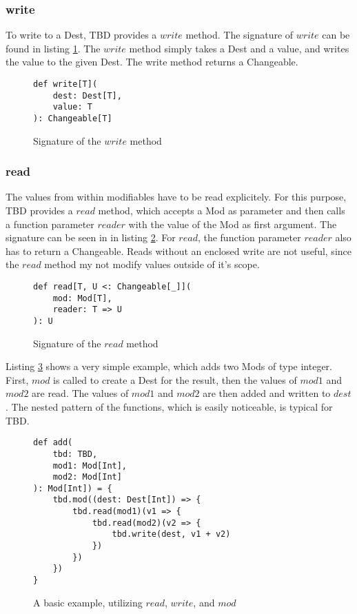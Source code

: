 \subsubsection{write}
To write to a Dest, TBD provides a $write$ method. The signature of $write$ can be found in listing \ref{code:write}. The $write$ method simply takes a Dest and a value, and writes the value to the given Dest. The write method returns a Changeable. 

\begin{figure}
\begin{lstlisting}[frame=single,basicstyle=\ttfamily]
def write[T](
    dest: Dest[T], 
    value: T
): Changeable[T]
\end{lstlisting}
\caption{Signature of the $write$ method}
\label{code:write}
\end{figure}

\subsubsection{read}
The values from within modifiables have to be read explicitely. For this purpose, TBD provides a $read$ method, which accepts a Mod as parameter and then calls a function parameter $reader$ with the value of the Mod as first argument. The signature can be seen in in listing \ref{code:read}. For $read$, the function parameter $reader$ also has to return a Changeable. Reads without an enclosed write are not useful, since the $read$ method my not modify values outside of it's scope.  

\begin{figure}
\begin{lstlisting}[frame=single,basicstyle=\ttfamily]
def read[T, U <: Changeable[_]](
    mod: Mod[T], 
    reader: T => U
): U
\end{lstlisting}
\caption{Signature of the $read$ method}
\label{code:read}
\end{figure}

Listing \ref{code:simpleExample} shows a very simple example, which adds two Mods of type integer. First, $mod$ is called to create a Dest for the result, then the values of $mod1$ and $mod2$ are read. The values of $mod1$ and $mod2$ are then added and written to $dest$. The nested pattern of the functions, which is easily noticeable, is typical for TBD. 

\begin{figure}
\begin{lstlisting}[frame=single,basicstyle=\ttfamily]
def add(
    tbd: TBD, 
    mod1: Mod[Int], 
    mod2: Mod[Int]
): Mod[Int]) = {
    tbd.mod((dest: Dest[Int]) => {
        tbd.read(mod1)(v1 => {
            tbd.read(mod2)(v2 => {
                tbd.write(dest, v1 + v2)
            })
        })
    })
}
\end{lstlisting}
\caption{A basic example, utilizing $read$, $write$, and $mod$}
\label{code:simpleExample}
\end{figure}

